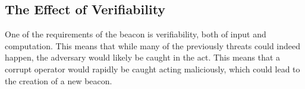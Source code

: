 \subsection{The Effect of Verifiability}
One of the requirements of the beacon is verifiability, both of input and computation.
This means that while many of the previously threats could indeed happen, the adversary would likely be caught in the act.
This means that a corrupt operator would rapidly be caught acting maliciously, which could lead to the creation of a new beacon.
